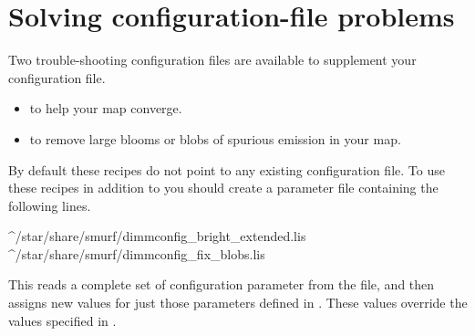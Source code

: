 \documentclass[11pt,oneside,chapters]{starlink}
\begin{document}


\section{Solving configuration-file problems}
\label{sec:problem}

Two trouble-shooting configuration files are available to supplement your
configuration file.
\begin{itemize}[noitemsep]
\item {} to help your map converge.
\item {} to remove large blooms or blobs of spurious
emission in your map.
\end{itemize}
By default these recipes do not point to any existing configuration file. To use
these recipes in addition to   you should
create a parameter file containing the following lines.

\begin{terminalv}
^/star/share/smurf/dimmconfig_bright_extended.lis
^/star/share/smurf/dimmconfig_fix_blobs.lis
\end{terminalv}

This reads a complete set of configuration parameter from the
 file, and then assigns new values for just
those parameters defined in . These values override
the values specified in .
\end{document}

